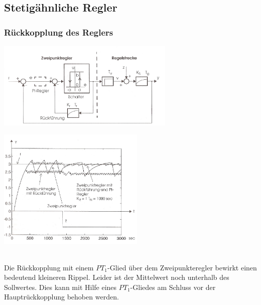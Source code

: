 	\subsection{Stetigähnliche Regler}
		\subsubsection{Rückkopplung des Reglers }
		\begin{minipage}{9cm}
		\includegraphics[width=8.5cm]{./bilder/ZweipunktreglerMitRueckfuehrung.jpg}
        \end{minipage}
		\begin{minipage}{7.5cm}
        \includegraphics[width=7cm]{./bilder/ZweipunktreglerMitRueckfuehrung_dia.jpg}
        \end{minipage}\\
		Die Rückkopplung mit einem $PT_1$-Glied über dem Zweipunkteregler bewirkt
		einen bedeutend kleineren Rippel. Leider ist der Mittelwert noch unterhalb des
		Sollwertes. Dies kann mit Hilfe eines $PT_1$-Gliedes am Schluss vor der
		Hauptrückkopplung behoben werden.
	
